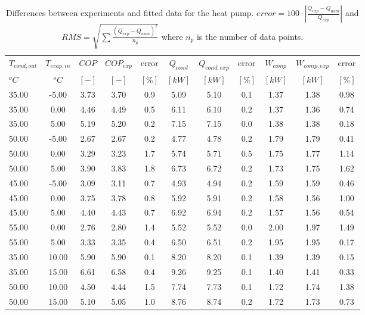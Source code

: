\documentclass[english]{SPFShortReport}
\begin{document}
\begin{table}[!ht]
\begin{small}
\caption{Differences between experiments and fitted data for the heat pump.          $error=100 \cdot |\frac{Q_{exp}-Q_{num}}{Q_{exp}}|$ and $RMS = \sqrt { \sum{\frac{(Q_{exp}-Q_{num})^2}{n_p}} }$ where $n_p$ is the number of data points.}
\begin{center}
\resizebox{12cm}{!} 
{
\begin{tabular}{l | c c c c c c c c c c } 
\hline
\hline
$T_{cond,out}$ &$T_{evap,in}$ &$COP$ &$COP_{exp}$ &error &$Q_{cond}$ &$Q_{cond,exp}$ &error &$W_{comp}$ &$W_{comp,exp}$ &error \\ 
$^oC$ &$^oC$ &$[-]$ &$[-]$ &$[\%]$ &$[kW]$ &$[kW]$ &$[\%]$ &$[kW]$ &$[kW]$ &$[\%]$\\ 
\hline
35.00  & -5.00 & 3.73 & 3.70 & 0.9 & 5.09 & 5.10 & 0.1 & 1.37 & 1.38 & 0.98\\ 
35.00  & 0.00 & 4.46 & 4.49 & 0.5 & 6.11 & 6.10 & 0.2 & 1.37 & 1.36 & 0.74\\ 
35.00  & 5.00 & 5.19 & 5.20 & 0.2 & 7.15 & 7.15 & 0.0 & 1.38 & 1.38 & 0.18\\ 
50.00  & -5.00 & 2.67 & 2.67 & 0.2 & 4.77 & 4.78 & 0.2 & 1.79 & 1.79 & 0.41\\ 
50.00  & 0.00 & 3.29 & 3.23 & 1.7 & 5.74 & 5.71 & 0.5 & 1.75 & 1.77 & 1.14\\ 
50.00  & 5.00 & 3.90 & 3.83 & 1.8 & 6.73 & 6.72 & 0.2 & 1.73 & 1.75 & 1.62\\ 
45.00  & -5.00 & 3.09 & 3.11 & 0.7 & 4.93 & 4.94 & 0.2 & 1.59 & 1.59 & 0.46\\ 
45.00  & 0.00 & 3.75 & 3.78 & 0.8 & 5.92 & 5.91 & 0.2 & 1.58 & 1.56 & 1.00\\ 
45.00  & 5.00 & 4.40 & 4.43 & 0.7 & 6.92 & 6.94 & 0.2 & 1.57 & 1.56 & 0.54\\ 
55.00  & 0.00 & 2.76 & 2.80 & 1.4 & 5.52 & 5.52 & 0.0 & 2.00 & 1.97 & 1.49\\ 
55.00  & 5.00 & 3.33 & 3.35 & 0.4 & 6.50 & 6.51 & 0.2 & 1.95 & 1.95 & 0.17\\ 
35.00  & 10.00 & 5.90 & 5.90 & 0.1 & 8.20 & 8.20 & 0.1 & 1.39 & 1.39 & 0.15\\ 
35.00  & 15.00 & 6.61 & 6.58 & 0.4 & 9.26 & 9.25 & 0.1 & 1.40 & 1.41 & 0.33\\ 
50.00  & 10.00 & 4.50 & 4.44 & 1.5 & 7.74 & 7.73 & 0.1 & 1.72 & 1.74 & 1.38\\ 
50.00  & 15.00 & 5.10 & 5.05 & 1.0 & 8.76 & 8.74 & 0.2 & 1.72 & 1.73 & 0.73\\ 

\end{tabular}}
\end{center}
\end{small}
\end{table}
\end{document}
